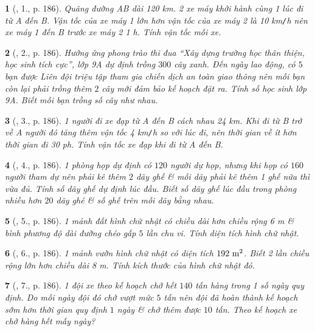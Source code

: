 \documentclass{article}
\newtheorem{baitoan}{}
\begin{document}
\begin{baitoan}[\cite{Thu_Viet_Minh_ptb2}, 1., p. 186]
	Quãng đường AB dài {\rm120 km}. 2 xe máy khởi hành cùng 1 lúc đi từ A đến B. Vận tốc của xe máy 1 lớn hơn vận tốc của xe máy 2 là {\rm10 km{\tt/}h} nên xe máy 1 đến B trước xe máy 2 {\rm1 h}. Tính vận tốc mỗi xe.
\end{baitoan}

\begin{baitoan}[\cite{Thu_Viet_Minh_ptb2}, 2., p. 186]
	Hưởng ứng phong trào thi đua ``Xây dựng trường học thân thiện, học sinh tích cực'', lớp 9A dự định trồng $300$ cây xanh. Đến ngày lao động, có $5$ bạn được Liên đội triệu tập tham gia chiến dịch an toàn giao thông nên mỗi bạn còn lại phải trồng thêm $2$ cây mới đảm bảo kế hoạch đặt ra. Tính số học sinh lớp 9A. Biết mỗi bạn trồng số cây như nhau.
\end{baitoan}

\begin{baitoan}[\cite{Thu_Viet_Minh_ptb2}, 3., p. 186]
	1 người đi xe đạp từ A đến B cách nhau {\rm24 km}. Khi đi từ B trở về A người đó tăng thêm vận tốc {\rm4 km{\tt/}h} so với lúc đi, nên thời gian về ít hơn thời gian đi {\rm30 ph}. Tính vận tốc xe đạp khi đi từ A đến B.
\end{baitoan}

\begin{baitoan}[\cite{Thu_Viet_Minh_ptb2}, 4., p. 186]
	1 phòng họp dự định có $120$ người dự họp, nhưng khi họp có $160$ người tham dự nên phải kê thêm $2$ dãy ghế \& mỗi dãy phải kê thêm 1 ghế nữa thì vừa đủ. Tính số dãy ghế dự định lúc đầu. Biết số dãy ghế lúc đầu trong phòng nhiều hơn $20$ dãy ghé \& số ghế trên mỗi dãy bằng nhau.
\end{baitoan}

\begin{baitoan}[\cite{Thu_Viet_Minh_ptb2}, 5., p. 186]
	1 mảnh đất hình chữ nhật có chiều dài hơn chiều rộng {\rm6 m} \& bình phương độ dài đường chéo gấp $5$ lần chu vi. Tính diện tích hình chữ nhật.
\end{baitoan}

\begin{baitoan}[\cite{Thu_Viet_Minh_ptb2}, 6., p. 186]
	1 mảnh vườn hình chữ nhật có diện tích $\rm192\ m^2$. Biết 2 lần chiều rộng lớn hơn chiều dài {\rm8 m}. Tính kích thước của hình chữ nhật đó.
\end{baitoan}

\begin{baitoan}[\cite{Thu_Viet_Minh_ptb2}, 7., p. 186]
	1 đội xe theo kế hoạch chở hết $140$ tấn hàng trong 1 số ngày quy định. Do mỗi ngày đội đó chở vượt mức $5$ tấn nên đội đã hoàn thành kế hoạch sớm hơn thời gian quy định $1$ ngày \& chở thêm được $10$ tấn. Theo kế hoạch xe chở hàng hết mấy ngày?
\end{baitoan}
\end{document}
